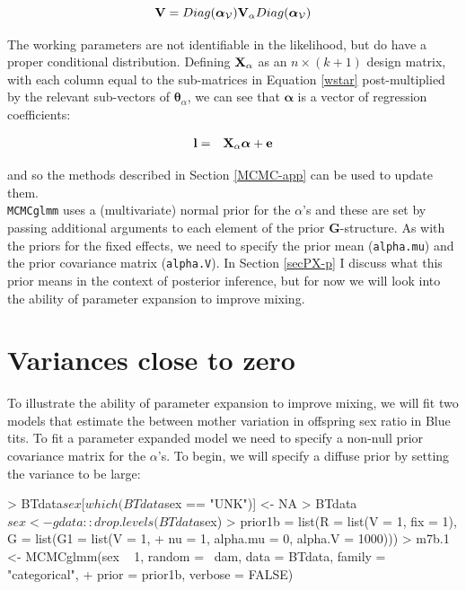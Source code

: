 \documentclass{article}
\begin{document}
\begin{equation} 
{\bf V} = Diag({\bm \alpha}_{\mathcal{V}}){\bf V}_{\alpha}Diag({\bm \alpha}_{\mathcal{V}})
\end{equation} 

The working parameters are not identifiable in the likelihood, but do have a proper conditional distribution.  Defining ${\bf X}_{\alpha}$ as an $n\times( k+1)$ design matrix,  with each column equal to the sub-matrices in Equation \ref{wstar} post-multiplied by the relevant sub-vectors of ${\bm \theta}_{\alpha}$, we can see that ${\bm \alpha}$ is a vector of regression coefficients: 

\begin{equation}
\begin{array}{rl}
\bf{l} =& {\bf X}_{\alpha}{\bm \alpha}+\bf{e}\\
\end{array}
\end{equation}

and so the methods described in Section \ref{MCMC-app} can be used to update them.\\ 

\texttt{MCMCglmm} uses a (multivariate) normal prior for the $\alpha$'s and these are set by passing additional arguments to each element of the prior {\bf G}-structure. As with the priors for the fixed effects, we need to specify the prior mean (\texttt{alpha.mu}) and the prior covariance matrix (\texttt{alpha.V}). In Section \ref{secPX-p} I discuss what this prior means in the context of posterior inference, but for now we will look into the ability of parameter expansion to improve mixing.

\section{Variances close to zero}

  To illustrate the ability of parameter expansion to improve mixing, we will fit  two models that estimate the between mother variation in offspring sex ratio in Blue tits.    To fit a parameter expanded model we need to specify a non-null prior covariance matrix for the $\alpha$'s.  To begin, we will specify a diffuse prior by setting the variance to be large:  

\begin{Schunk}
\begin{Sinput}
> BTdata$sex[which(BTdata$sex == "UNK")] <- NA
> BTdata$sex <- gdata::drop.levels(BTdata$sex)
> prior1b = list(R = list(V = 1, fix = 1), G = list(G1 = list(V = 1, 
+     nu = 1, alpha.mu = 0, alpha.V = 1000)))
> m7b.1 <- MCMCglmm(sex ~ 1, random = ~dam, data = BTdata, family = "categorical", 
+     prior = prior1b, verbose = FALSE)
\end{Sinput}
\end{Schunk}
\end{document}
